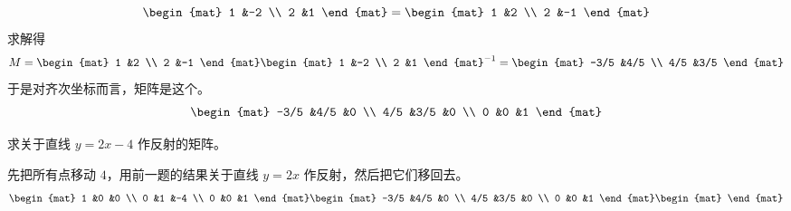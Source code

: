\begin{exercises}
\begin{answer}
\begin{equation*}
        \begin{mat}
          1  &-2  \\
          2  &1
        \end{mat}
        =
        \begin{mat}
          1  &2  \\
          2  &-1
        \end{mat}
      \end{equation*}
      求解得
      \begin{equation*}
        M =
            \begin{mat}
              1  &2  \\
              2  &-1
            \end{mat}
            \begin{mat}
              1  &-2  \\
              2  &1     
            \end{mat}^{-1}
          =
            \begin{mat}
              -3/5  &4/5 \\
              4/5   &3/5
            \end{mat}
      \end{equation*}
      于是对齐次坐标而言，矩阵是这个。
      \begin{equation*}
      \begin{mat}
        -3/5  &4/5  &0  \\
         4/5  &3/5  &0  \\
           0  &0    &1
      \end{mat}
      \end{equation*}
    \end{answer}
  \item 求关于直线 $y=2x-4$ 作反射的矩阵。
    \begin{answer}
      先把所有点移动 $4$，用前一题的结果关于直线 $y=2x$ 作反射，然后把它们移回去。
      \begin{equation*}
      \begin{mat}
        1  &0  &0  \\
        0  &1  &-4 \\
        0  &0  &1
      \end{mat}
      \begin{mat}
        -3/5  &4/5  &0  \\
         4/5  &3/5  &0  \\
           0  &0    &1
      \end{mat}
      \begin{mat}

\end{mat}
\end{equation*}
\end{answer}
\end{exercises}
